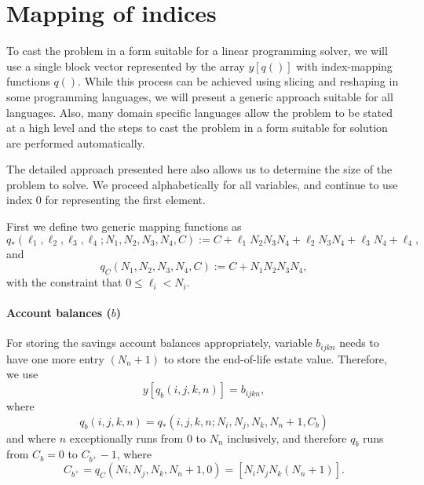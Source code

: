 \documentclass{article}[fleqn,12pt]
\begin{document}
\section{Mapping of indices}
To cast the problem in a form suitable for a linear programming solver, we will use
a single block vector represented by the array $y[q()]$ with index-mapping functions $q()$.
While this process can be achieved using slicing and reshaping in some programming
languages, we will present a generic approach suitable for all languages. Also,
many domain specific languages allow the problem to be stated at a high level and
the steps to cast the problem in a form suitable for solution are performed automatically.

The detailed approach presented here also allows us to determine the size of the problem to solve.
We proceed alphabetically for all variables, and continue to use
index 0 for representing the first element.

First we define two generic mapping functions as
\begin{equation}
	q_*(\ell_1, \ell_2, \ell_3, \ell_4; N_1, N_2, N_3, N_4, C) :=
	C + \ell_1N_2N_3N_4 + \ell_2N_3N_4 + \ell_3N_4 + \ell_4,
\end{equation}
and
\begin{equation}
	q_C(N_1, N_2, N_3, N_4, C) :=
	C + N_1N_2N_3N_4,
\end{equation}
with the constraint that $0 \le \ell_i < N_i$.

\paragraph*{Account balances (\boldmath$b$)}
For storing the savings account balances appropriately, variable $b_{ijkn}$ needs to have one
more entry $(N_n + 1)$ to
store the end-of-life estate value. Therefore, we use
\begin{equation}
	y[q_b(i, j, k, n)] = b_{ijkn},
\end{equation}
where
\begin{equation}
	\label{Eq:Extra}
	q_b(i, j, k, n) = q_*(i, j, k, n; N_i, N_j, N_k, N_n+1, C_b)
\end{equation}
and where $n$ exceptionally runs from 0 to $N_n$ inclusively, and therefore
$q_b$ runs from $C_b = 0$ to $C_{b^+} - 1$,
where
\[
	C_{b^+} = q_C(Ni, N_j, N_k, N_n+1, 0) = [N_i N_j N_k (N_n+1)].
\]
\end{document}
